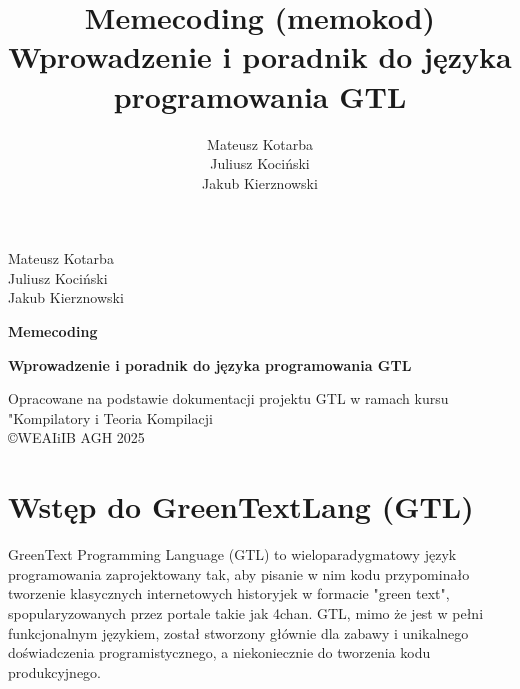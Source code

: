\documentclass[12pt,a4paper]{article}
\title{Memecoding (memokod) \\ \large Wprowadzenie i poradnik do języka programowania GTL}
\author{Mateusz Kotarba \\ Juliusz Kociński \\ Jakub Kierznowski}
\date{} %
\begin{document}
\begin{titlepage}
    \centering
    \vspace{1.5cm}
    {\large Mateusz Kotarba \\ Juliusz Kociński \\ Jakub Kierznowski\par}
    {\Huge\bfseries Memecoding\par}
    \vspace{0.5cm}
    {\Large\bfseries Wprowadzenie i poradnik do języka programowania GTL\par}
    \vspace{1.5cm}

    {\small Opracowane na podstawie dokumentacji projektu GTL w ramach kursu "Kompilatory i Teoria Kompilacji \\
    \copyright WEAIiIB AGH 2025 \par}
\end{titlepage}

\tableofcontents
\newpage


\section{Wstęp do GreenTextLang (GTL)}
\label{sec:introduction}
GreenText Programming Language (GTL) to wieloparadygmatowy język programowania zaprojektowany tak, aby pisanie w nim kodu przypominało tworzenie klasycznych internetowych historyjek w formacie "green text", spopularyzowanych przez portale takie jak 4chan. GTL, mimo że jest w pełni funkcjonalnym językiem, został stworzony głównie dla zabawy i unikalnego doświadczenia programistycznego, a niekoniecznie do tworzenia kodu produkcyjnego.
\end{document}
